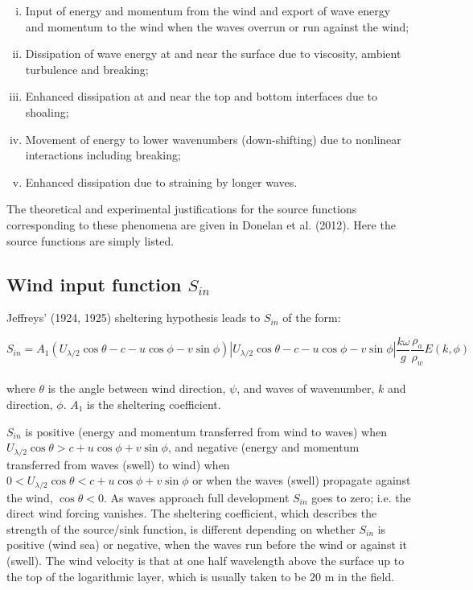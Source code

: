 \documentclass[letterpaper]{article}
\numberwithin{equation}{section}
\begin{document}
\begin{enumerate}[(i)]
\item Input of energy and momentum from the wind and export of wave energy and momentum to the wind when the waves overrun or run against the wind; \\

\item Dissipation of wave energy at and near the surface due to viscosity, ambient turbulence and breaking; \\

\item Enhanced dissipation at and near the top and bottom interfaces due to shoaling; \\

\item Movement of energy to lower wavenumbers (down-shifting) due to nonlinear interactions including breaking; \\

\item Enhanced dissipation due to straining by longer waves. \\
\end{enumerate}

The theoretical and experimental justifications for the source functions 
corresponding to these phenomena are given in Donelan et al. (2012). 
Here the source functions are simply listed.

\subsection{Wind input function $S_{in}$}

Jeffreys' (1924, 1925) sheltering hypothesis leads to $S_{in}$ of the form:

\begin{equation}
S_{in}=A_{1}\left(U_{\lambda/2}\cos{\theta}-c-u\cos{\phi}-v\sin{\phi}\right)
            \left|U_{\lambda/2}\cos{\theta}-c-u\cos{\phi}-v\sin{\phi}\right|
            \dfrac{k\omega}{g}\dfrac{\rho_{a}}{\rho_{w}}E(k,\phi)
\label{sin1} 
\end{equation}
\\
where $\theta$ is the angle between wind direction, $\psi$,
and waves of wavenumber, $k$ and direction, $\phi$. $A_{1}$ is the sheltering coefficient.

$S_{in}$ is positive (energy and momentum transferred from wind to waves)
when $U_{\lambda/2}\cos{\theta}>c+u\cos{\phi}+v\sin{\phi}$,
and negative (energy and momentum transferred from waves (swell) to wind)
when $0<U_{\lambda/2}\cos{\theta}<c+u\cos{\phi}+v\sin{\phi}$ or
when the waves (swell) propagate against the wind, $\cos{\theta}<0$.
As waves approach full development $S_{in}$ goes to zero; i.e. the direct wind forcing vanishes.
The sheltering coefficient, which describes the strength of the source/sink function,
is different depending on whether $S_{in}$ is positive (wind sea) or negative, when the waves
run before the wind or against it (swell).
The wind velocity is that at one half wavelength above the surface up to the top of the logarithmic layer,
which is usually taken to be $20$ m in the field.
\end{document}
